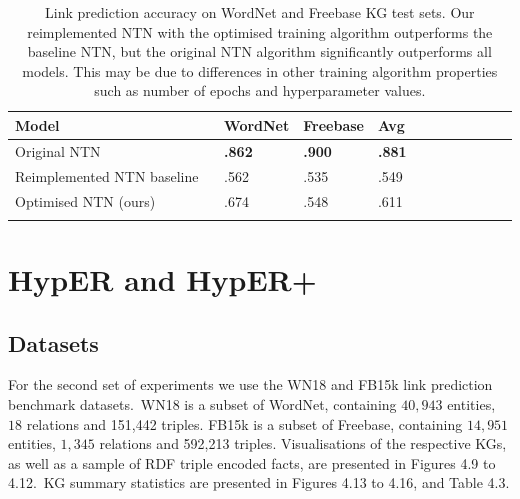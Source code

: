 \begin{table}[H]
	\centering
	\begin{tabular}{lllllllllll}
  		\textbf{Model} & \textbf{WordNet} & \textbf{Freebase} & \textbf{Avg} \\
  		\hline
  		Original NTN \unskip ~\citep{socher2013reasoning} & \textbf{.862} & \textbf{.900} & \textbf{.881} \\
  		Reimplemented NTN baseline  \unskip ~\citep{Doss2015} & .562 & .535 & .549 \\
  		\hline
  		Optimised NTN (ours) & .674 & .548 & .611 \\
		&
	\end{tabular}
	\captionsetup{justification=centering}
	\caption{Link prediction accuracy on WordNet and Freebase KG test sets. Our reimplemented NTN with the optimised training algorithm outperforms the baseline NTN, but the original NTN algorithm significantly outperforms all models. This may be due to differences in other training algorithm properties such as number of epochs and hyperparameter values.}
\end{table}



\section{HypER and HypER+}

\subsection{Datasets} 
For the second set of experiments we use the WN18 \citep{bordes2013translating} and FB15k \citep{bordes2013translating} link prediction benchmark datasets.\ WN18 is a subset of WordNet, containing $ 40, 943 $ entities, $ 18 $ relations and 151,442 triples. FB15k is a subset of Freebase, containing $ 14, 951 $ entities, $ 1, 345 $ relations and 592,213 triples. Visualisations of the respective KGs, as well as a sample of RDF triple encoded facts, are presented in Figures 4.9 to 4.12.\ KG summary statistics are presented in Figures 4.13 to 4.16, and Table 4.3. 

